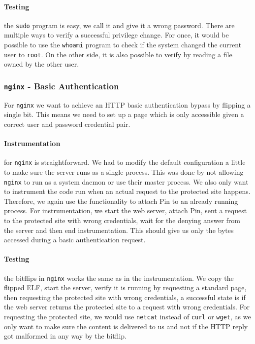 \paragraph{Testing} the \texttt{sudo} program is easy, we call it and give it a
wrong password. There are multiple ways to verify a successful privilege change.
For once, it would be possible to use the \texttt{whoami} program to check if
the system changed the current user to \texttt{root}. On the other side, it is
also possible to verify by reading a file owned by the other user.

\subsubsection{\texttt{nginx} - Basic Authentication}

For \texttt{nginx} we want to achieve an HTTP basic authentication bypass by
flipping a single bit. This means we need to set up a page which is only
accessible given a correct user and password credential pair.

\paragraph{Instrumentation} for \texttt{nginx} is straightforward. We had to
modify the default configuration a little to make sure the server runs as a
single process. This was done by not allowing \texttt{nginx} to run as a system
daemon or use their master process. We also only want to instrument the code run
when an actual request to the protected site happens. Therefore, we again use
the functionality to attach Pin to an already running process. For
instrumentation, we start the web server, attach Pin, sent a request to the
protected site with wrong credentials, wait for the denying answer from the
server and then end instrumentation. This should give us only the bytes accessed
during a basic authentication request.

\paragraph{Testing} the bitflips in \texttt{nginx} works the same as in the
instrumentation. We copy the flipped ELF, start the server, verify it is running
by requesting a standard page, then requesting the protected site with wrong
credentials, a successful state is if the web server returns the protected site
to a request with wrong credentials. For requesting the protected site, we would
use \texttt{netcat} instead of \texttt{curl} or \texttt{wget}, as we only want
to make sure the content is delivered to us and not if the HTTP reply got
malformed in any way by the bitflip.

